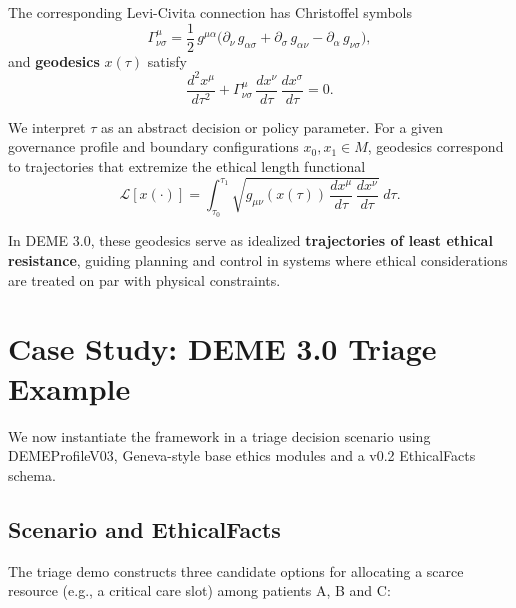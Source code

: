\documentclass[12pt]{article}
\theoremstyle{remark}
\begin{document}
The corresponding Levi-Civita connection has Christoffel symbols
\begin{equation}
    \Gamma^{\mu}_{\nu\sigma}
    = \frac{1}{2}\, g^{\mu\alpha}
      \bigl(\partial_\nu\, g_{\alpha\sigma}
            + \partial_\sigma\, g_{\alpha\nu}
            - \partial_\alpha\, g_{\nu\sigma}\bigr),
\end{equation}
and \textbf{geodesics} $x(\tau)$ satisfy
\begin{equation}
    \frac{d^2 x^\mu}{d\tau^2}
    + \Gamma^{\mu}_{\nu\sigma}\,
      \frac{dx^\nu}{d\tau}\, \frac{dx^\sigma}{d\tau} = 0.
\end{equation}

We interpret $\tau$ as an abstract decision or policy parameter. For a given governance profile and boundary configurations $x_0, x_1 \in M$, geodesics correspond to trajectories that extremize the ethical length functional
\begin{equation}
    \mathcal{L}[x(\cdot)]
    = \int_{\tau_0}^{\tau_1}
      \sqrt{g_{\mu\nu}(x(\tau))\,
            \frac{dx^\mu}{d\tau}\, \frac{dx^\nu}{d\tau}}\; d\tau.
\end{equation}

In DEME 3.0, these geodesics serve as idealized \textbf{trajectories of least ethical resistance}, guiding planning and control in systems where ethical considerations are treated on par with physical constraints.

\section{Case Study: DEME 3.0 Triage Example}

We now instantiate the framework in a triage decision scenario using DEMEProfileV03, Geneva-style base ethics modules and a v0.2 EthicalFacts schema.

\subsection{Scenario and EthicalFacts}

The triage demo constructs three candidate options for allocating a scarce resource (e.g., a critical care slot) among patients A, B and C:
\end{document}
